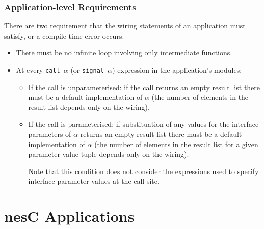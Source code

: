 \documentclass[11pt]{article}
\newcommand{\code}[1]{{\tt #1}}
\newcommand{\nesc}{nesC\xspace}
\begin{document}
\subsubsection{Application-level Requirements}
\label{sec:wiring-reqs}

There are two requirement that the wiring statements of an application must
satisfy, or a compile-time error occurs:
\begin{itemize}
\item There must be no infinite loop involving only intermediate functions.
\item At every \code{call $\alpha$} (or \code{signal $\alpha$}) expression
in the application's modules:
\begin{itemize}
\item If the call is unparameterised: if the call returns an empty result
list there must be a default implementation of $\alpha$ (the number of
elements in the result list depends only on the wiring).
\item If the call is parameterised: if substituation of any values for the
interface parameters of $\alpha$ returns an empty result list there must be
a default implementation of $\alpha$ (the number of elements in the result
list for a given parameter value tuple depends only on the wiring).

Note that this condition does not consider the expressions used to specify
interface parameter values at the call-site.
\end{itemize}
\end{itemize}

\section{\nesc Applications}
\label{sec:app}
\end{document}
